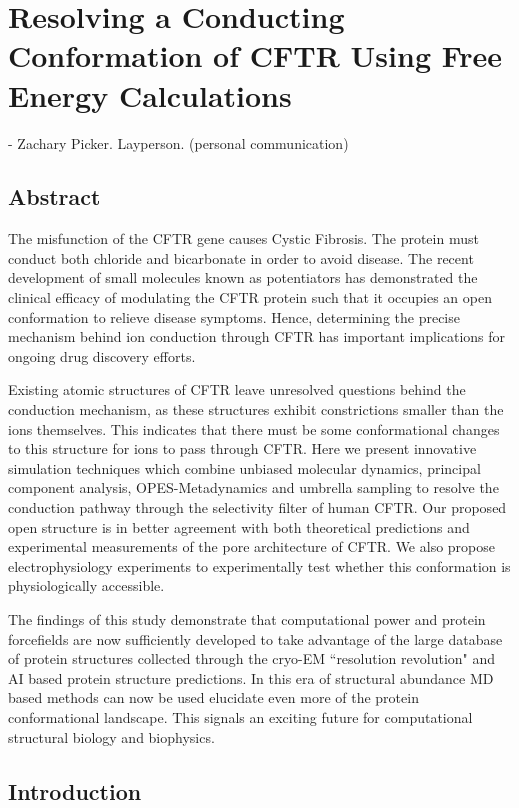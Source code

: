 \chapter{Resolving a Conducting Conformation of CFTR Using Free Energy Calculations}
\label{chap:opening}
\setcounter{figure}{0}
\renewcommand{\thefigure}{\arabic{chapter}.\arabic{figure}}
 {- Zachary Picker. Layperson. (personal communication)}


\section*{\centering Abstract} 
The misfunction of the CFTR gene causes Cystic Fibrosis. The protein must conduct both chloride and bicarbonate in order to avoid disease. The recent development of small molecules known as potentiators has demonstrated the clinical efficacy of modulating the CFTR protein such that it occupies an open conformation to relieve disease symptoms. Hence, determining the precise mechanism behind ion conduction through CFTR has important implications for ongoing drug discovery efforts.

Existing atomic structures of CFTR leave unresolved questions behind the conduction mechanism, as these structures exhibit constrictions smaller than the ions themselves. This indicates that there must be some conformational changes to this structure for ions to pass through CFTR. Here we present innovative simulation techniques which combine unbiased molecular dynamics, principal component analysis, OPES-Metadynamics and umbrella sampling to resolve the conduction pathway through the selectivity filter of human CFTR. Our proposed open structure is in better agreement with both theoretical predictions and experimental measurements of the pore architecture of CFTR. We also propose electrophysiology experiments to experimentally test whether this conformation is physiologically accessible.  

The findings of this study demonstrate that computational power and protein forcefields are now sufficiently developed to take advantage of the large database of protein structures collected through the cryo-EM ``resolution revolution" and AI based protein structure predictions. In this era of structural abundance MD based methods can now be used elucidate even more of the protein conformational landscape. This signals an exciting future for computational structural biology and biophysics.

\section{Introduction}

